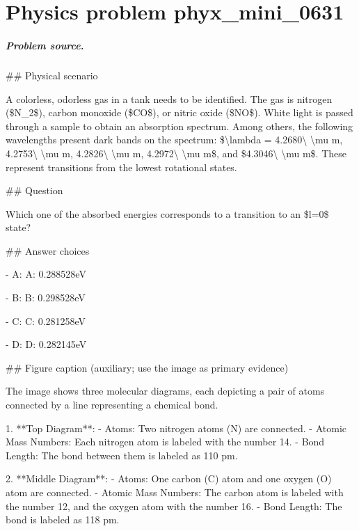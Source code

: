 
\chapter{Physics problem phyx\_mini\_0631}
\label{ch:PhyXMiniProblems_problem_phyx_mini_0631}

\paragraph{Problem source.}
\#\# Physical scenario

A colorless, odorless gas in a tank needs to be identified. The gas is nitrogen (\$N\_2\$), carbon monoxide (\$CO\$), or nitric oxide (\$NO\$). White light is passed through a sample to obtain an absorption spectrum. Among others, the following wavelengths present dark bands on the spectrum: \$\textbackslash{}lambda = 4.2680\textbackslash{} \textbackslash{}mu m, 4.2753\textbackslash{} \textbackslash{}mu m, 4.2826\textbackslash{} \textbackslash{}mu m, 4.2972\textbackslash{} \textbackslash{}mu m\$, and \$4.3046\textbackslash{} \textbackslash{}mu m\$. These represent transitions from the lowest rotational states.

\#\# Question

Which one of the absorbed energies corresponds to a transition to an \$l=0\$ state?

\#\# Answer choices

- A: A: 0.288528eV

- B: B: 0.298528eV

- C: C: 0.281258eV

- D: D: 0.282145eV

\#\# Figure caption (auxiliary; use the image as primary evidence)

The image shows three molecular diagrams, each depicting a pair of atoms connected by a line representing a chemical bond. 

1. **Top Diagram**:
   - Atoms: Two nitrogen atoms (N) are connected.
   - Atomic Mass Numbers: Each nitrogen atom is labeled with the number 14.
   - Bond Length: The bond between them is labeled as 110 pm.

2. **Middle Diagram**:
   - Atoms: One carbon (C) atom and one oxygen (O) atom are connected.
   - Atomic Mass Numbers: The carbon atom is labeled with the number 12, and the oxygen atom with the number 16.
   - Bond Length: The bond is labeled as 118 pm.

